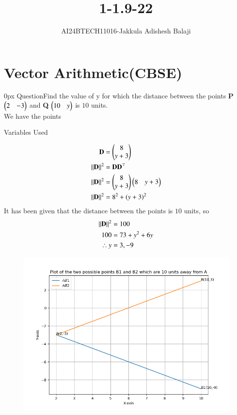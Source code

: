 \documentclass[journal]{IEEEtran}
\begin{document}

\renewcommand{\thefigure}{\theenumi}
\renewcommand{\thetable}{\theenumi}
\setlength{\intextsep}{10pt} %
\renewcommand{\thetable}{\theenumi}
\title{1-1.9-22}

\author{AI24BTECH11016-Jakkula Adishesh Balaji}
\maketitle
\bigskip
\section*{\textbf{Vector Arithmetic(CBSE)}}
         \parindent 0px
         QuestionFind the value of y for which the distance between the points \textbf{P} $\begin{pmatrix}2 & -3\end{pmatrix}$ and \textbf{Q} $\begin{pmatrix}10 & y\end{pmatrix}$ is $10$ units. \\
	\solution We have the points \\
	\begin{table}[h!]
         	\centering
         	
         	\caption{Variables Used}
         	\label{tab1.9.22}
         \end{table}
         \begin{align}
         	\mathbf{D}	&= \begin{pmatrix}8\\y+3\end{pmatrix} \\
		\left\lVert\mathbf{D}\right\rVert^2 &= \mathbf{D}\mathbf{D}^\top \\
		\left\lVert\mathbf{D}\right\rVert^2 &= \begin{pmatrix}8\\y+3\end{pmatrix}\begin{pmatrix}8 & y+3\end{pmatrix} \\
		\left\lVert\mathbf{D}\right\rVert^2 &= 8^{2} + \left(y+3\right)^{2} \\
	\end{align}
	It has been given that the distance between the points is $10$ units, so \\
	\begin{align}
	\left\lVert\mathbf{D}\right\rVert^2 &= 100 	 \\
       	100 &= 73 + y^{2} + 6y \\
 	\therefore y &= 3,-9 \\
	\end{align}
	\begin{figure}[h]
		\centering
		\includegraphics[scale=0.6]{figs/plot.png}
		\label{Fig}
	\end{figure}
\end{document}
